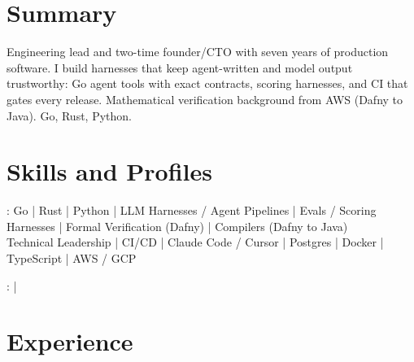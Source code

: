 \documentclass[print]{jack-resume}
\begin{document}
\pagecolor{darkmodeBackground}


\begin{minipage}[t][1cm][t]{.03\textwidth}
    \hfill
\end{minipage}

\section{Summary}
Engineering lead and two-time founder/CTO with seven years of production software. I build harnesses that keep agent-written and model output trustworthy: Go agent tools with exact contracts, scoring harnesses, and CI that gates every release. Mathematical verification background from AWS (Dafny to Java). Go, Rust, Python.
\sectionsep

\section{Skills and Profiles}
:
Go \hfill | \hfill
Rust \hfill | \hfill
Python \hfill | \hfill
LLM Harnesses / Agent Pipelines \hfill | \hfill
Evals / Scoring Harnesses \hfill | \hfill
Formal Verification (Dafny) \hfill | \hfill
Compilers (Dafny to Java) \\
\hspace{1.0cm} Technical Leadership \hfill | \hfill
CI/CD \hfill | \hfill
Claude Code / Cursor \hfill | \hfill
Postgres \hfill | \hfill
Docker \hfill | \hfill
TypeScript \hfill | \hfill
AWS / GCP \\

\raggedright{
    :
      \href{https://www.linkedin.com/in/jack-sturtevant/}{ \ExternalLink} |
     \href{https://github.com/jacksturt}{ \ExternalLink}}

\section{Experience}
\end{document}
